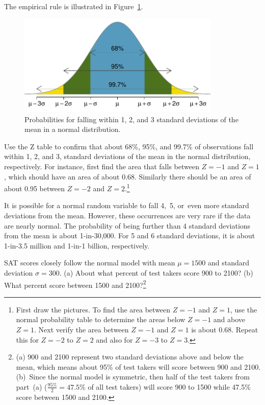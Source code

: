 The empirical rule is illustrated in Figure~\ref{6895997}.

\begin{figure}[H]
\centering
\includegraphics[height=1.9in]{03/figures/6895997/6895997}
\caption{Probabilities for falling within 1, 2, and 3 standard deviations of the mean in a normal distribution.}
\label{6895997}
\end{figure}




\begin{exercise}
Use the Z table to confirm that about 68\%, 95\%, and 99.7\% of observations fall within 1, 2, and 3, standard deviations of the mean in the normal distribution, respectively. For instance, first find the area that falls between $Z=-1$ and $Z=1$, which should have an area of about 0.68. Similarly there should be an area of about 0.95 between $Z=-2$ and $Z=2$.\footnote{First draw the pictures. To find the area between $Z=-1$ and $Z=1$, use the normal probability table to determine the areas below $Z=-1$ and above $Z=1$. Next verify the area between $Z=-1$ and $Z=1$ is about 0.68. Repeat this for $Z=-2$ to $Z=2$ and also for $Z=-3$ to $Z=3$.}
\end{exercise}

It is possible for a normal random variable to fall 4,~5, or~even more standard deviations from the mean. However, these occurrences are very rare if the data are nearly normal. The probability of being further than 4 standard deviations from the mean is about 1-in-30,000. For 5 and 6 standard deviations, it is about 1-in-3.5 million and 1-in-1 billion, respectively.

\begin{exercise}
SAT scores closely follow the normal model with mean $\mu = 1500$ and standard deviation $\sigma = 300$. (a) About what percent of test takers score 900 to 2100? (b) What percent score between 1500 and 2100?\footnote{(a) 900 and 2100 represent two standard deviations above and below the mean, which means about 95\% of test takers will score between 900 and 2100. (b)~Since the normal model is symmetric, then half of the test takers from part~(a) ($\frac{95\%}{2} = 47.5\%$ of all test takers) will score 900 to 1500 while 47.5\% score between 1500 and 2100.}
\end{exercise}






